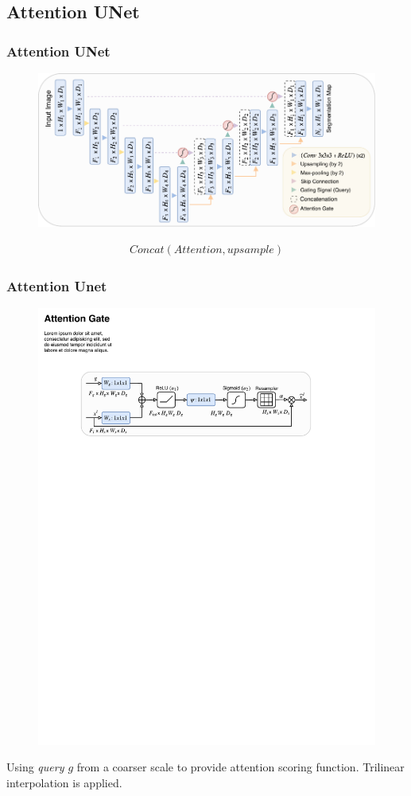 \documentclass[]{beamer}
\begin{document}
\subsection{Attention UNet}
\begin{frame}
    \frametitle{Attention UNet}
    \begin{figure}
        \centering
        \includegraphics[scale = 0.7]{figure4.pdf}
    \end{figure}
    \begin{align*}
        Concat(Attention, upsample)
    \end{align*}
\end{frame}
\begin{frame}
    \frametitle{Attention Unet}
    \begin{figure}
        \centering
        \includegraphics[scale = 0.9]{figure3.pdf}
    \end{figure}
    Using \emph{query $g$}  from a coarser scale to provide attention scoring function.
    Trilinear interpolation is applied.
\end{frame}
\end{document}

